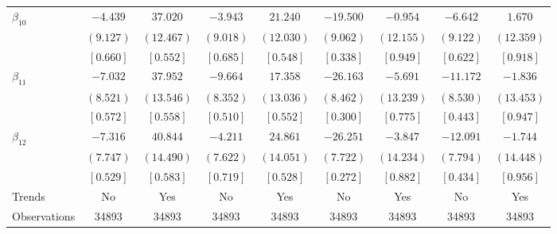 \documentclass[12pt]{article}
\begin{document}
\begin{table}[h!]
\begin{adjustbox}{width=\textwidth}
\begin{tabular}{lcccccccc}
 $\beta_{10}$  & $ -4.439$ & $ 37.020$ & $ -3.943$ & $ 21.240$ & $-19.500$ & $ -0.954$ & $ -6.642$ & $  1.670$ \\
& $(  9.127)$ & $( 12.467)$ & $(  9.018)$ & $( 12.030)$ & $(  9.062)$ & $( 12.155)$ & $(  9.122)$ & $( 12.359)$ \\
& $[  0.660]$ & $[  0.552]$ & $[  0.685]$ & $[  0.548]$ & $[  0.338]$ & $[  0.949]$ & $[  0.622]$ & $[  0.918]$ \\
 $\beta_{11}$  & $ -7.032$ & $ 37.952$ & $ -9.664$ & $ 17.358$ & $-26.163$ & $ -5.691$ & $-11.172$ & $ -1.836$ \\
& $(  8.521)$ & $( 13.546)$ & $(  8.352)$ & $( 13.036)$ & $(  8.462)$ & $( 13.239)$ & $(  8.530)$ & $( 13.453)$ \\
& $[  0.572]$ & $[  0.558]$ & $[  0.510]$ & $[  0.552]$ & $[  0.300]$ & $[  0.775]$ & $[  0.443]$ & $[  0.947]$ \\
 $\beta_{12}$  & $ -7.316$ & $ 40.844$ & $ -4.211$ & $ 24.861$ & $-26.251$ & $ -3.847$ & $-12.091$ & $ -1.744$ \\
& $(  7.747)$ & $( 14.490)$ & $(  7.622)$ & $( 14.051)$ & $(  7.722)$ & $( 14.234)$ & $(  7.794)$ & $( 14.448)$ \\
& $[  0.529]$ & $[  0.583]$ & $[  0.719]$ & $[  0.528]$ & $[  0.272]$ & $[  0.882]$ & $[  0.434]$ & $[  0.956]$ \\
\bottomrule
Trends & No & Yes & No & Yes & No & Yes & No & Yes \\
Observations & 34893 & 34893 & 34893 & 34893 & 34893 & 34893 & 34893 & 34893 \\
\bottomrule
\end{tabular}
\end{adjustbox}
\end{table}
\end{document}
